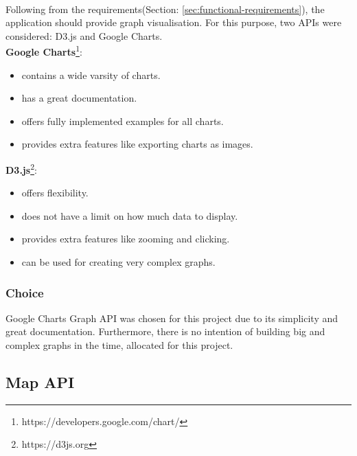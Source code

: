 \documentclass{l4proj}
\begin{document}
\paragraph{}
Following from the requirements(Section: \ref{sec:functional-requirements}), the application should provide graph visualisation. For this purpose, two APIs were considered: D3.js and Google Charts.  
\\\hspace*{7mm}\textbf{Google Charts}\footnote{https://developers.google.com/chart/}:
\begin{multicols}{2}
	\begin{itemize}[noitemsep]
		\item contains a wide varsity of charts.
		\item has a great documentation.
		\item offers fully implemented examples for all charts. 
		\item provides extra features like exporting charts as images.
	\end{itemize} 
\end{multicols}
\textbf{D3.js}\footnote{https://d3js.org}:
\begin{multicols}{2}
	\begin{itemize}[noitemsep]
		\item offers flexibility.
		\item does not have a limit on how much data to display.
		\item provides extra features like zooming and clicking.
		\item can be used for creating very complex graphs.
	\end{itemize} 
\end{multicols}
\subsubsection{Choice}
Google Charts Graph API was chosen for this project due to its simplicity and great documentation. Furthermore, there is no intention of building big and complex graphs in the time, allocated for this project.  

\subsection{Map API}
\end{document}
